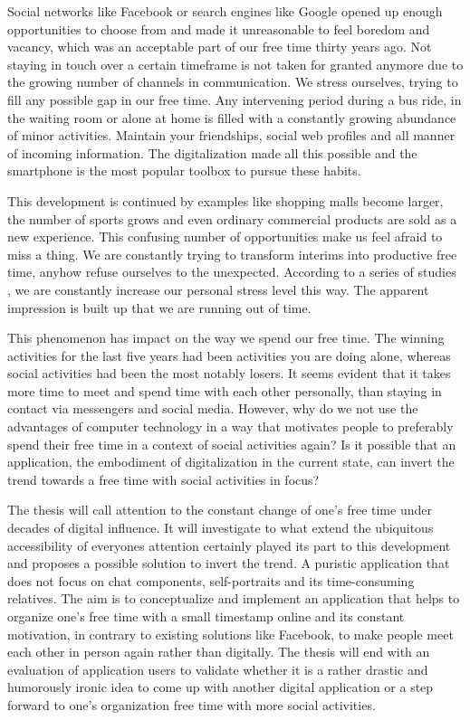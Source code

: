 \documentclass[12pt,numbers=noenddot,parskip,bibliography=totocnumbered,listof=totocnumbered]{scrreprt}
\begin{document}
Social networks like Facebook or search engines like Google opened up enough opportunities to choose from and made it unreasonable to feel boredom and vacancy, which was an acceptable part of our free time thirty years ago. Not staying in touch over a certain timeframe is not taken for granted anymore due to the growing number of channels in communication. We stress ourselves, trying to fill any possible gap in our free time. Any intervening period during a bus ride, in the waiting room or alone at home is filled with a constantly growing abundance of minor activities. Maintain your friendships, social web profiles and all manner of incoming information. The digitalization made all this possible and the smartphone is the most popular toolbox to pursue these habits. %

This development is continued by examples like shopping malls become larger, the number of sports grows and even ordinary commercial products are sold as a new experience. This confusing number of opportunities make us feel afraid to miss a thing. We are constantly trying to transform interims into productive free time, anyhow refuse ourselves to the unexpected. According to a series of studies \citep[p. 14]{freizeitmonitor2016}, we are constantly increase our personal stress level this way. The apparent impression is built up that we are running out of time. 

This phenomenon has impact on the way we spend our free time. The winning activities for the last five years had been activities you are doing alone, whereas social activities had been the most notably losers. It seems evident that it takes more time to meet and spend time with each other personally, than staying in contact via messengers and social media. However, why do we not use the advantages of computer technology in a way that motivates people to preferably spend their free time in a context of social activities again? Is it possible that an application, the embodiment of digitalization in the current state, can invert the trend towards a free time with social activities in focus? %

The thesis will call attention to the constant change of one's free time under decades of digital influence. It will investigate to what extend the ubiquitous accessibility of everyones attention certainly played its part to this development and proposes a possible solution to invert the trend. A puristic application that does not focus on chat components, self-portraits and its time-consuming relatives. The aim is to conceptualize and implement an application that helps to organize one's free time with a small timestamp online and its constant motivation, in contrary to existing solutions like Facebook, to make people meet each other in person again rather than digitally. The thesis will end with an evaluation of application users to validate whether it is a rather drastic and humorously ironic idea to come up with another digital application or a step forward to one's organization free time with more social activities.
\end{document}
